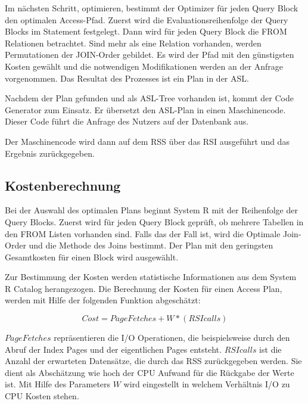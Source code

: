 Im nächsten Schritt, optimieren, bestimmt der Optimizer für jeden Query Block den optimalen Access-Pfad. Zuerst wird die Evaluationsreihenfolge der Query Blocks im Statement festgelegt. Dann wird für jeden Query Block die FROM Relationen betrachtet. Sind mehr als eine Relation vorhanden, werden Permutationen der JOIN-Order gebildet. Es wird der Pfad mit den günstigsten Kosten gewählt und die notwendigen Modifikationen werden an der Anfrage vorgenommen. Das Resultat des Prozesses ist ein Plan in der \ac{ASL}.

Nachdem der Plan gefunden und als \ac{ASL}-Tree vorhanden ist, kommt der Code Generator zum Einsatz. Er übersetzt den \ac{ASL}-Plan in einen  Maschinencode. Dieser Code führt die Anfrage des Nutzers auf der Datenbank aus. 

Der Maschinencode wird dann auf dem \ac{RSS} über das \ac{RSI} ausgeführt und das Ergebnis zurückgegeben.

\subsection{Kostenberechnung}
Bei der Auswahl des optimalen Plans beginnt System R mit der Reihenfolge der Query Blocks. Zuerst wird für jeden Query Block geprüft, ob mehrere Tabellen in den FROM Listen vorhanden sind. Falls das der Fall ist, wird die Optimale Join-Order und die Methode des Joins bestimmt. Der Plan mit den geringsten Gesamtkosten für einen Block wird ausgewählt.

Zur Bestimmung der Kosten werden statistische Informationen aus dem System R Catalog herangezogen. Die Berechnung der Kosten für einen Access Plan, werden mit Hilfe der folgenden Funktion abgeschätzt:

$$Cost = Page Fetches + W * (RSI calls)$$


$Page Fetches$ repräsentieren die I/O Operationen, die beispielsweise durch den Abruf der Index Pages und der eigentlichen Pages entsteht. $RSI calls$ ist die Anzahl der erwarteten Datensätze, die durch das \ac{RSS} zurückgegeben werden. Sie dient als Abschätzung wie hoch der CPU Aufwand für die Rückgabe der Werte ist. Mit Hilfe des Parameters $W$ wird eingestellt in welchem Verhältnis I/O zu CPU Kosten stehen.




